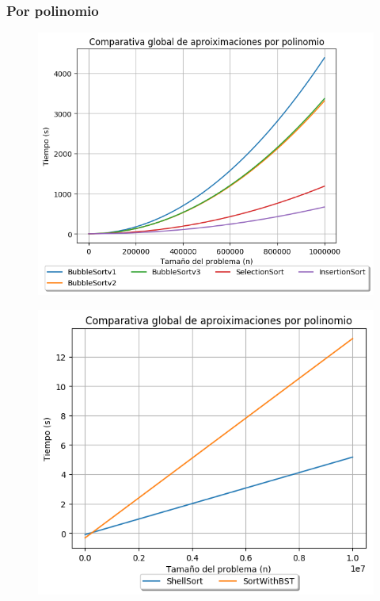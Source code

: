\documentclass[12pt, fleqn]{report}                             %
\theoremstyle{break}                                            %
\begin{document}
    	  \clearpage
	        
	        \subsubsection{Por polinomio}
	            \begin{figure}[H]
    	            \centering
    	            \includegraphics[scale=0.84]{graphics/globalComparativePolynomial2.png}
    	        \end{figure}
    	        
    	        \begin{figure}[H]
    	            \centering
    	            \includegraphics[scale=0.84]{graphics/globalComparativePolynomial3.png}
    	        \end{figure}
    	        
\end{document}
